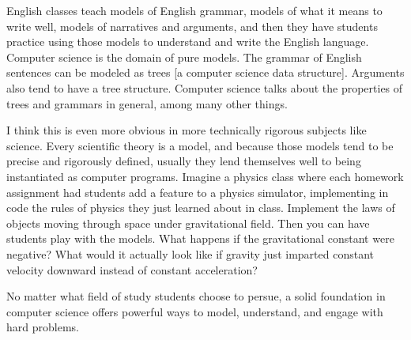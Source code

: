 \begin{blockquote}
	English classes teach models of English grammar, models of what it means to write well, models of narratives and arguments, and then they have students practice using those models to understand and write the English language. Computer science is the domain of pure models. The grammar of English sentences can be modeled as trees [a computer science data structure]. Arguments also tend to have a tree structure. Computer science talks about the properties of trees and grammars in general, among many other things. \par
	I think this is even more obvious in more technically rigorous subjects like science. Every scientific theory is a model, and because those models tend to be precise and rigorously defined, usually they lend themselves well to being instantiated as computer programs. Imagine a physics class where each homework assignment had students add a feature to a physics simulator, implementing in code the rules of physics they just learned about in class. Implement the laws of objects moving through space under gravitational field. Then you can have students play with the models. What happens if the gravitational constant were negative? What would it actually look like if gravity just imparted constant velocity downward instead of constant acceleration? 
	\end{blockquote} 
No matter what field of study students choose to persue, a solid foundation in computer science offers powerful ways to model, understand, and engage with hard problems. \par

